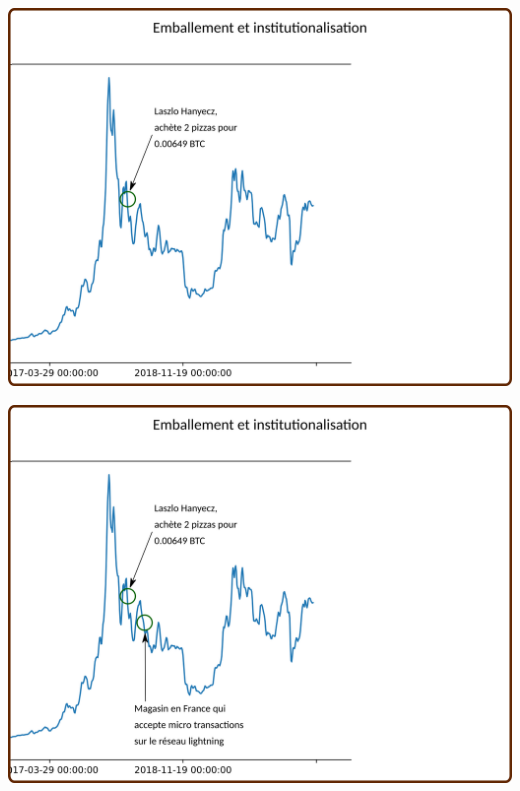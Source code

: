 \documentclass[presentation]{beamer}
\begin{document}
\begin{frame}[label={sec:orgdeef69c}]{}
\begin{center}
\includegraphics[width=.95\textwidth]{./Pictures/Timeline/80emballement_pizza.png}
\end{center}
\end{frame}

\begin{frame}[label={sec:org60e6605}]{}
\begin{center}
\includegraphics[width=.95\textwidth]{./Pictures/Timeline/81emballement_magasin.png}
\end{center}
\end{frame}
\end{document}
